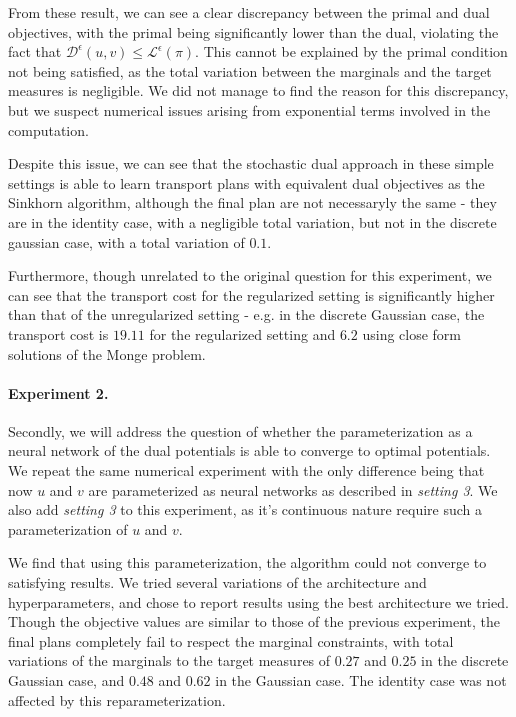 \documentclass[a4paper,11pt]{article}
\newcommand{\1}{\mathbbm{1}}
\begin{document}
From these result, we can see a clear discrepancy between the primal and dual objectives, with the primal being significantly lower than the dual, violating the fact that $\mathcal{D}^{\epsilon}(u, v) \leq \mathcal{L}^{\epsilon}(\pi)$. This cannot be explained by the primal condition not being satisfied, as the total variation between the marginals and the target measures is negligible. We did not manage to find the reason for this discrepancy, but we suspect numerical issues arising from exponential terms involved in the computation.

Despite this issue, we can see that the stochastic dual approach in these simple settings is able to learn transport plans with equivalent dual objectives as the Sinkhorn algorithm, although the final plan are not necessaryly the same - they are in the identity case, with a negligible total variation, but not in the discrete gaussian case, with a total variation of $0.1$.

Furthermore, though unrelated to the original question for this experiment, we can see that the transport cost for the regularized setting is significantly higher than that of the unregularized setting - e.g. in the discrete Gaussian case, the transport cost is $19.11$ for the regularized setting and $6.2$ using close form solutions of the Monge problem.

\paragraph{Experiment 2.}Secondly, we will address the question of whether the parameterization as a neural network of the dual potentials is able to converge to optimal potentials. We repeat the same numerical experiment with the only difference being that now $u$ and $v$ are parameterized as neural networks as described in \emph{setting 3}. We also add \emph{setting 3} to this experiment, as it's continuous nature require such a parameterization of $u$ and $v$.

We find that using this parameterization, the algorithm could not converge to satisfying results. We tried several variations of the architecture and hyperparameters, and chose to report results using the best architecture we tried. Though the objective values are similar to those of the previous experiment, the final plans completely fail to respect the marginal constraints, with total variations of the marginals to the target measures of $0.27$ and $0.25$ in the discrete Gaussian case, and $0.48$ and $0.62$ in the Gaussian case. The identity case was not affected by this reparameterization.
\end{document}
